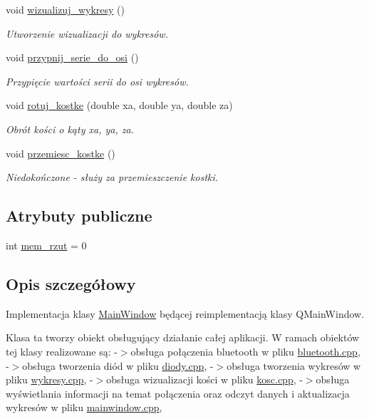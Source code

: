 \begin{DoxyCompactItemize}
void \hyperlink{class_main_window_a1efac5efcb844bf7db47b844f7c6d87e}{wizualizuj\+\_\+wykresy} ()
\begin{DoxyCompactList}\small\item\em Utworzenie wizualizacji do wykresów. \end{DoxyCompactList}\item 
void \hyperlink{class_main_window_a07cf16cd47bfdef75cebcfc3e2e02c4d}{przypnij\+\_\+serie\+\_\+do\+\_\+osi} ()
\begin{DoxyCompactList}\small\item\em Przypięcie wartości serii do osi wykresów. \end{DoxyCompactList}\item 
void \hyperlink{class_main_window_a36136fd65f9fbac0ed55909c48657958}{rotuj\+\_\+kostke} (double xa, double ya, double za)
\begin{DoxyCompactList}\small\item\em Obrót kości o kąty xa, ya, za. \end{DoxyCompactList}\item 
void \hyperlink{class_main_window_a7d6f7650da80dc76a49f89be8a87e856}{przemiesc\+\_\+kostke} ()
\begin{DoxyCompactList}\small\item\em Niedokończone -\/ służy za przemieszczenie kostki. \end{DoxyCompactList}\end{DoxyCompactItemize}
\subsection*{Atrybuty publiczne}
\begin{DoxyCompactItemize}
\item 
int \hyperlink{class_main_window_a7801ba2425266ceee18c478629a27186}{mem\+\_\+rzut} = 0
\end{DoxyCompactItemize}


\subsection{Opis szczegółowy}
Implementacja klasy \hyperlink{class_main_window}{Main\+Window} będącej reimplementacją klasy Q\+Main\+Window. 

Klasa ta tworzy obiekt obsługujący działanie całej aplikacji. W ramach obiektów tej klasy realizowane są\+: -\/$>$obsługa połączenia bluetooth w pliku \hyperlink{bluetooth_8cpp}{bluetooth.\+cpp}, -\/$>$obsługa tworzenia diód w pliku \hyperlink{diody_8cpp}{diody.\+cpp}, -\/$>$obsługa tworzenia wykresów w pliku \hyperlink{wykresy_8cpp}{wykresy.\+cpp}, -\/$>$obsługa wizualizacji kości w pliku \hyperlink{kosc_8cpp}{kosc.\+cpp}, -\/$>$obsługa wyświetlania informacji na temat połączenia oraz odczyt danych i aktualizacja wykresów w pliku \hyperlink{mainwindow_8cpp}{mainwindow.\+cpp}, 

